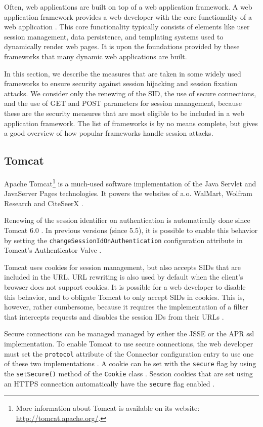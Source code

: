 Often, web applications are built on top of a web application framework. A \gls{web application framework} provides a web developer with the core functionality of a web application \cite{Schwartz2010}. This core functionality typically consists of elements like user session management, data persistence, and templating systems used to dynamically render web pages. It is upon the foundations provided by these frameworks that many dynamic web applications are built.

In this section, we describe the measures that are taken in some widely used frameworks to ensure security against session hijacking and session fixation attacks. We consider only the renewing of the SID, the use of secure connections, and the use of GET and POST parameters for session management, because these are the security measures that are most eligible to be included in a web application framework. The list of frameworks is by no means complete\cite{FrameworksComparison}, but gives a good overview of how popular frameworks handle session attacks.

\subsection{Tomcat}

Apache Tomcat\footnote{More information about Tomcat is available on its website: \url{http://tomcat.apache.org/}.} is a much-used software implementation of the Java Servlet and JavaServer Pages technologies. It powers the websites of a.o. WalMart, Wolfram Research and CiteSeerX \cite{TomcatPoweredBy}.

Renewing of the session identifier on authentication is automatically done since Tomcat 6.0 \cite{TomcatAuthentication6}. In previous versions (since 5.5), it is possible to enable this behavior by setting the \texttt{changeSessionIdOnAuthentication} configuration attribute in Tomcat's Authenticator Valve \cite{TomcatAuthentication5}.

Tomcat uses cookies for session management, but also accepts SIDs that are included in the URL. URL rewriting is also used by default when the client's browser does not support cookies. It is possible for a web developer to disable this behavior, and to obligate Tomcat to only accept SIDs in cookies. This is, however, rather cumbersome, because it requires the implementation of a filter that intercepts requests and disables the session IDs from their URLs \cite{Condit2006}.

Secure connections can be managed managed by either the JSSE or the APR \gls{ssl} implementation. To enable Tomcat to use secure connections, the web developer must set the \texttt{protocol} attribute of the Connector configuration entry to use one of these two implementations \cite{TomcatSSL}. A cookie can be set with the \texttt{secure} flag by using the \texttt{setSecure()} method of the \texttt{Cookie} class \cite{TomcatCookie}. Session cookies that are set using an HTTPS connection automatically have the \texttt{secure} flag enabled \cite{Funk2004}.

